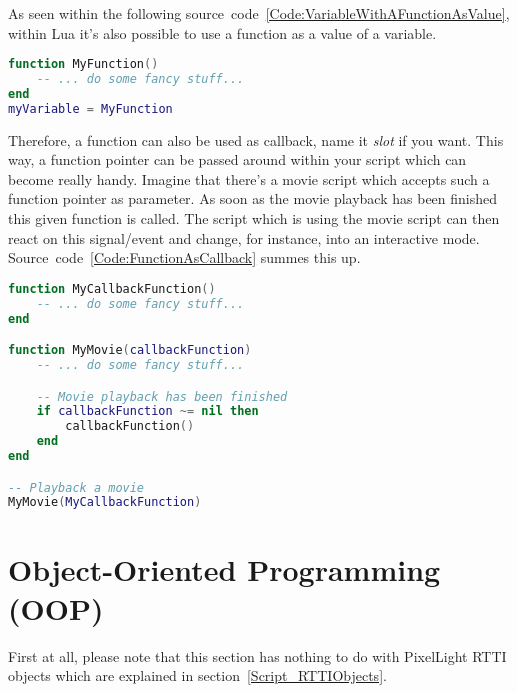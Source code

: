 As seen within the following source~code~\ref{Code:VariableWithAFunctionAsValue}, within Lua it's also possible to use a function as a value of a variable.
\begin{lstlisting}[language=lua,float=htb,label=Code:VariableWithAFunctionAsValue,caption={Variable with a function as value}]
function MyFunction()
	-- ... do some fancy stuff...
end
myVariable = MyFunction
\end{lstlisting}
Therefore, a function can also be used as callback, name it \emph{slot} if you want. This way, a function pointer can be passed around within your script which can become really handy. Imagine that there's a movie script which accepts such a function pointer as parameter. As soon as the movie playback has been finished this given function is called. The script which is using the movie script can then react on this signal/event and change, for instance, into an interactive mode. Source~code~\ref{Code:FunctionAsCallback} summes this up.
\begin{lstlisting}[language=lua,float=htb,label=Code:FunctionAsCallback,caption={Function as callback}]
function MyCallbackFunction()
	-- ... do some fancy stuff...
end

function MyMovie(callbackFunction)
	-- ... do some fancy stuff...

	-- Movie playback has been finished
	if callbackFunction ~= nil then
		callbackFunction()
	end
end

-- Playback a movie
MyMovie(MyCallbackFunction)
\end{lstlisting}




\section{Object-Oriented Programming (OOP)}
First at all, please note that this section has nothing to do with PixelLight \ac{RTTI} objects which are explained in section~\ref{Script_RTTIObjects}.

